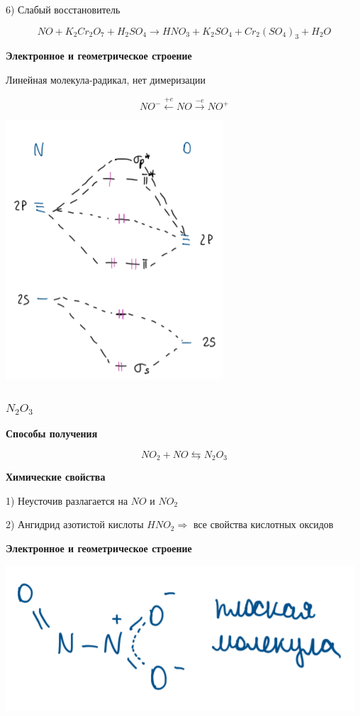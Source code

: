 \documentclass[14pt,a4paper]{scrartcl}
\begin{document}
6) Слабый восстановитель

$$NO + K_2Cr_2O_7 + H_2SO_4 \rightarrow HNO_3 + K_2SO_4 + Cr_2(SO_4)_3 + H_2O$$

\textbf{Электронное и геометрическое строение}

Линейная молекула-радикал, нет димеризации

$$NO^- \xleftarrow{+e} NO \xrightarrow{-e}  NO^+$$

\includegraphics{8v8.png}

\subsubsection{$N_2O_3$}

\textbf{Способы получения}

$$NO_2 + NO \leftrightarrows N_2O_3$$

\textbf{Химические свойства}

1) Неусточив разлагается на $NO$ и $NO_2$

2) Ангидрид азотистой кислоты $HNO_2 \Rightarrow$ все свойства кислотных оксидов

\textbf{Электронное и геометрическое строение}

\includegraphics{8v9.png}
\end{document}
